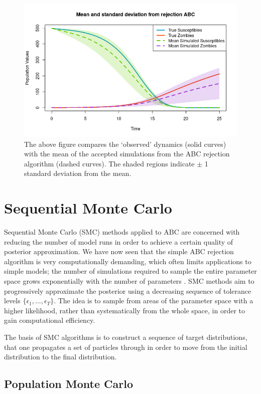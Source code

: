 \documentclass[]{article}
\begin{document}
\begin{figure}[H]
	\centering
	\includegraphics[width=0.8\linewidth]{../Figures/rej_abc_sd_bands}
	\caption{The above figure compares the `observed' dynamics (solid curves) with the mean of the accepted simulations from the ABC rejection algorithm (dashed curves). The shaded regions indicate $\pm$ 1 standard deviation from the mean.}
	\label{rej_abc_sd}
\end{figure}




\section{Sequential Monte Carlo}

Sequential Monte Carlo (SMC) methods applied to ABC are concerned with reducing the number of model runs in order to achieve a certain quality of posterior approximation. We have now seen that the simple ABC rejection algorithm is very computationally demanding, which often limits applications to simple models; the number of simulations required to sample the entire parameter space grows exponentially with the number of parameters \citep{RN32}. SMC methods aim to progressively approximate the posterior using a decreasing sequence of tolerance levels $\{\epsilon_1, ..., \epsilon_T\}$. The idea is to sample from areas of the parameter space with a higher likelihood, rather than systematically from the whole space, in order to gain computational efficiency.

The basis of SMC algorithms is to construct a sequence of target distributions, that one propagates a set of particles through in order to move from the initial distribution to the final distribution. 

\subsection{Population Monte Carlo}
\end{document}
